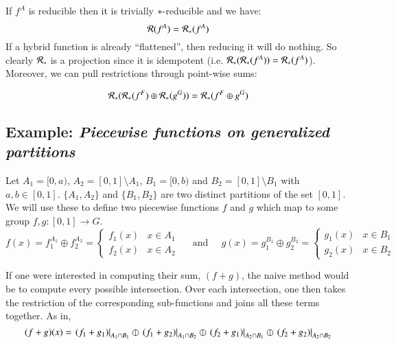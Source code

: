 If $f^A$ is reducible then it is trivially $*$-reducible and we have:
\begin{equation}
	\mathcal{R}(f^A) = \mathcal{R}_*(f^A)
\end{equation}
If a hybrid function is already ``flattened'', then reducing it will do nothing.
So clearly $\mathcal{R}_*$ is a projection since it is idempotent  (i.e. $\mathcal{R}_* ( \mathcal{R}_*( f^A)) = \mathcal{R}_*(f^A)$).
Moreover, we can pull restrictions through point-wise sums:

\begin{equation}
	\mathcal{R}_*( \mathcal{R}_*(f^F) \oplus \mathcal{R}_*(g^G)) =\mathcal{R}_*( f^F \oplus g^G)
\end{equation}



\subsection{Example: \emph{Piecewise functions on generalized partitions}} 
\label{example:piecewise1}

Let $A_1 = [0,a)$, $A_2 = [0,1] \setminus A_1$, $B_1 = [0,b)$ and $B_2 = [0,1] \setminus B_1$ with  $a,b \in [0,1]$.
$\{ A_1, A_2\}$ and $\{B_1, B_2\}$ are two distinct partitions of the set $[0,1]$.
We will use these to define two piecewise functions $f$ and $g$ which map to some group $f,g:[0,1] \to G$.
\begin{equation*}
	f(x) = f_1^{A_1} \oplus f_2^{A_2}
		= \begin{cases}
			f_1(x) & x \in A_1 \\
			f_2(x) & x \in A_2
		\end{cases}
	\;\;\;\;\; \text{and} \;\;\;\;\;
	g(x) = g_1^{B_1} \oplus g_2^{B_2}
		= \begin{cases}
			g_1(x) & x \in B_1 \\
			g_2(x) & x \in B_2
		\end{cases}
\end{equation*}

If one were interested in computing their sum, $(f+g)$, the naive method would be to compute every possible intersection.
Over each intersection, one then takes the restriction of the corresponding sub-functions and joins all these terms together.
As in,
\begin{equation*}
	(f+g)(x) = \left.(f_1 + g_1)\right|_{A_1 \cap B_1} 
		\varobar \left.(f_1 + g_2)\right|_{A_1 \cap B_2} 
		\varobar \left.(f_2 + g_1)\right|_{A_2 \cap B_1}
		\varobar \left.(f_2 + g_2)\right|_{A_2 \cap B_2}
\end{equation*}

